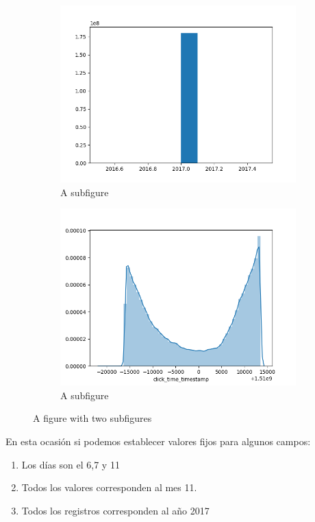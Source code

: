 \begin{figure}[H]
	\centering
	\begin{subfigure}{.5\textwidth}
		\centering
\includegraphics[scale=0.5]{img/click_time_year_distribution.png}
		\caption{A subfigure}
		\label{fig:sub1}
	\end{subfigure}%
	\begin{subfigure}{.5\textwidth}
		\centering
\includegraphics[scale=0.5]{img/normalDistclick_time_timestamp.png}
		\caption{A subfigure}
		\label{fig:sub2}
	\end{subfigure}
	\caption{A figure with two subfigures}
	\label{fig:test}
\end{figure}

En esta ocasión si podemos establecer valores fijos para algunos campos:
\begin{enumerate}
	\item Los días son el 6,7 y 11
	\item Todos los valores corresponden al mes 11.
	\item Todos los registros corresponden al año 2017
\end{enumerate}

